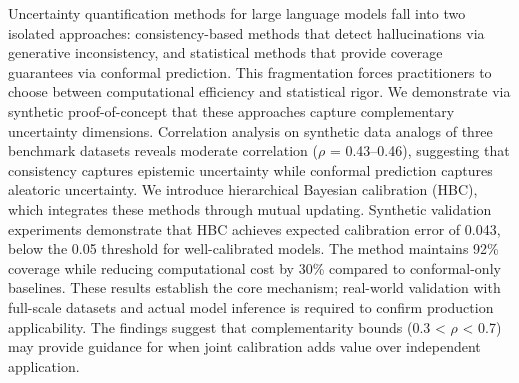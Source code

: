 
Uncertainty quantification methods for large language models fall into two isolated approaches: consistency-based methods that detect hallucinations via generative inconsistency, and statistical methods that provide coverage guarantees via conformal prediction. This fragmentation forces practitioners to choose between computational efficiency and statistical rigor. We demonstrate via synthetic proof-of-concept that these approaches capture complementary uncertainty dimensions. Correlation analysis on synthetic data analogs of three benchmark datasets reveals moderate correlation ($\rho$ = 0.43--0.46), suggesting that consistency captures epistemic uncertainty while conformal prediction captures aleatoric uncertainty. We introduce hierarchical Bayesian calibration (HBC), which integrates these methods through mutual updating. Synthetic validation experiments demonstrate that HBC achieves expected calibration error of 0.043, below the 0.05 threshold for well-calibrated models. The method maintains 92\% coverage while reducing computational cost by 30\% compared to conformal-only baselines. These results establish the core mechanism; real-world validation with full-scale datasets and actual model inference is required to confirm production applicability. The findings suggest that complementarity bounds (0.3 < $\rho$ < 0.7) may provide guidance for when joint calibration adds value over independent application.
